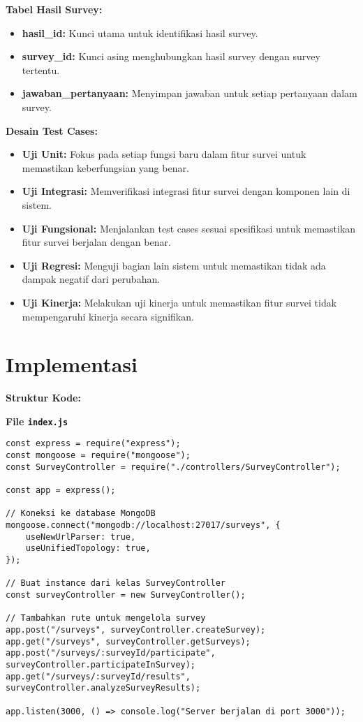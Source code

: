 \documentclass[12pt]{article}
\begin{document}
\textbf{Tabel Hasil Survey:}
\begin{itemize}
  \item \textbf{hasil\_id:} Kunci utama untuk identifikasi hasil survey.
  \item \textbf{survey\_id:} Kunci asing menghubungkan hasil survey dengan survey tertentu.
  \item \textbf{jawaban\_pertanyaan:} Menyimpan jawaban untuk setiap pertanyaan dalam survey.
\end{itemize}



\textbf{Desain Test Cases:}
\begin{itemize}
  \item \textbf{Uji Unit:} Fokus pada setiap fungsi baru dalam fitur survei untuk memastikan keberfungsian yang benar.
  \item \textbf{Uji Integrasi:} Memverifikasi integrasi fitur survei dengan komponen lain di sistem.
  \item \textbf{Uji Fungsional:} Menjalankan test cases sesuai spesifikasi untuk memastikan fitur survei berjalan dengan benar.
  \item \textbf{Uji Regresi:} Menguji bagian lain sistem untuk memastikan tidak ada dampak negatif dari perubahan.
  \item \textbf{Uji Kinerja:} Melakukan uji kinerja untuk memastikan fitur survei tidak mempengaruhi kinerja secara signifikan.
\end{itemize}


\section*{Implementasi}

\textbf{Struktur Kode:}

\textbf{File \texttt{index.js}}

\begin{verbatim}
const express = require("express");
const mongoose = require("mongoose");
const SurveyController = require("./controllers/SurveyController");

const app = express();

// Koneksi ke database MongoDB
mongoose.connect("mongodb://localhost:27017/surveys", {
    useNewUrlParser: true,
    useUnifiedTopology: true,
});

// Buat instance dari kelas SurveyController
const surveyController = new SurveyController();

// Tambahkan rute untuk mengelola survey
app.post("/surveys", surveyController.createSurvey);
app.get("/surveys", surveyController.getSurveys);
app.post("/surveys/:surveyId/participate", surveyController.participateInSurvey);
app.get("/surveys/:surveyId/results", surveyController.analyzeSurveyResults);

app.listen(3000, () => console.log("Server berjalan di port 3000"));
\end{verbatim}
\end{document}
